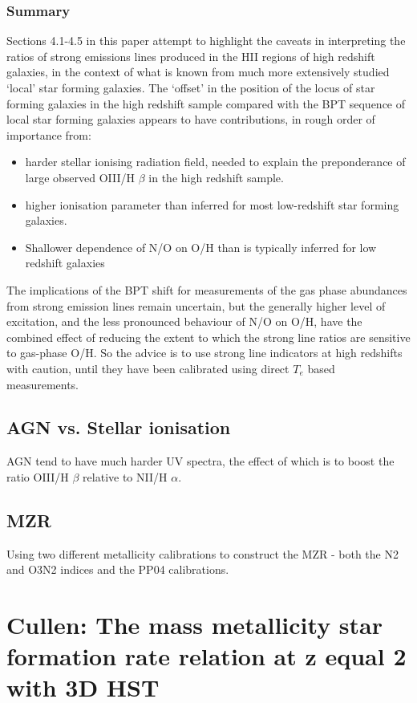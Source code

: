 \documentclass{literature}
\begin{document}
\subsubsection{Summary}
Sections 4.1-4.5 in this paper attempt to highlight the caveats in interpreting the ratios of strong emissions lines produced in the HII regions of high redshift galaxies, in the context of what is known from much more extensively studied `local' star forming galaxies. The `offset' in the position of the locus of star forming galaxies in the high redshift sample compared with the BPT sequence of local star forming galaxies appears to have contributions, in rough order of importance from: 

\begin{itemize}
	\item harder stellar ionising radiation field, needed to explain the preponderance of large observed OIII/H $\beta$ in the high redshift sample. 
	\item higher ionisation parameter than inferred for most low-redshift star forming galaxies. 
	\item Shallower dependence of N/O on O/H than is typically inferred for low redshift galaxies 
\end{itemize}

 The implications of the BPT shift for measurements of the gas phase abundances from strong emission lines remain uncertain, but the generally higher level of excitation, and the less pronounced behaviour of N/O on O/H, have the combined effect of reducing the extent to which the strong line ratios are sensitive to gas-phase O/H. So the advice is to use strong line indicators at high redshifts with caution, until they have been calibrated using direct $T_{e}$ based measurements. 
\subsection{AGN vs. Stellar ionisation}
AGN tend to have much harder UV spectra, the effect of which is to boost the ratio OIII/H $\beta$ relative to NII/H $\alpha$. 
\subsection{MZR}
Using two different metallicity calibrations to construct the MZR - both the N2 and O3N2 indices and the PP04 calibrations. 


\section{Cullen: The mass metallicity star formation rate relation at z equal 2 with 3D HST}
\end{document}
